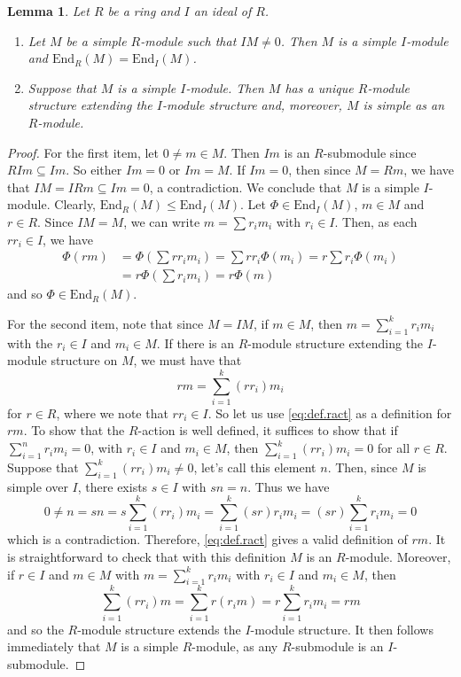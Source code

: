 \documentclass[11pt,reqno]{amsart}
\theoremstyle{plain}
\newtheorem{lem}[thm]{Lemma}
\numberwithin{equation}{section}
\begin{document}
\begin{lem}\label{l:restrict.ideals}
Let $R$ be a ring and $I$ an ideal of $R$.
\begin{enumerate}
\item Let $M$ be a simple $R$-module such that $IM\neq 0$.  Then $M$ is a simple $I$-module and $\mathrm{End}_R(M)=\mathrm{End}_I(M)$.
\item Suppose that $M$ is a simple $I$-module. Then $M$ has a unique $R$-module structure extending the $I$-module structure and, moreover, $M$ is simple as an $R$-module.
\end{enumerate}
\end{lem}
\begin{proof}
For the first item, let $0\neq m\in M$.  Then $Im$ is an $R$-submodule since $RIm\subseteq Im$. So either $Im=0$ or $Im=M$.  If $Im=0$, then since $M=Rm$, we have that $IM=IRm\subseteq Im=0$, a contradiction.  We conclude that $M$ is a simple $I$-module.  Clearly, $\mathrm{End}_R(M)\leq \mathrm{End}_I(M)$.  Let $\Phi\in \mathrm{End}_I(M)$, $m\in M$ and $r\in R$.  Since $IM=M$, we can write $m =\sum r_im_i$ with $r_i\in I$.  Then, as each $rr_i\in I$, we have
\begin{align*}
\Phi(rm) &= \Phi\left(\sum rr_im_i\right) = \sum rr_i\Phi(m_i) = r\sum r_i\Phi(m_i)\\
& = r\Phi\left(\sum r_im_i\right)=r\Phi(m)
\end{align*}
 and so $\Phi\in \mathrm{End}_R(M)$.


For the second item, note that since $M=IM$, if $m\in M$, then $m=\sum_{i=1}^k r_im_i$ with the $r_i\in I$ and $m_i\in M$.  If there is an $R$-module structure extending the $I$-module structure on $M$, we must have that
\begin{equation}\label{eq:def.ract}
rm=\sum_{i=1}^k(rr_i)m_i
\end{equation}
 for $r\in R$, where we note that $rr_i\in I$.    So let us use \eqref{eq:def.ract} as a definition for $rm$.  To show that the $R$-action is well defined, it suffices to show that if $\sum_{i=1}^nr_im_i=0$, with $r_i\in I$ and $m_i\in M$, then $\sum_{i=1}^k(rr_i)m_i=0$ for all $r\in R$.  Suppose that $\sum_{i=1}^k(rr_i)m_i\neq 0$, let's call this element $n$.  Then, since $M$ is simple over $I$, there exists $s\in I$ with $sn=n$.  Thus we have
 \[0\neq n=sn = s\sum_{i=1}^k (rr_i)m_i = \sum_{i=1}^k(sr)r_im_i=(sr)\sum_{i=1}^kr_im_i =0\] which is a contradiction.  Therefore, \eqref{eq:def.ract} gives a valid definition of $rm$.  It is straightforward to check that with this definition $M$ is an $R$-module.
  Moreover, if $r\in I$ and $m\in M$ with $m=\sum_{i=1}^k r_im_i$ with $r_i\in I$ and $m_i\in M$, then \[\sum_{i=1}^k(rr_i)m = \sum_{i=1}^k r(r_im) = r\sum_{i=1}^kr_im_i = rm\] and so the $R$-module structure extends the $I$-module structure. It then follows immediately that $M$ is a simple $R$-module, as any $R$-submodule is an $I$-submodule.
\end{proof}
\end{document}
